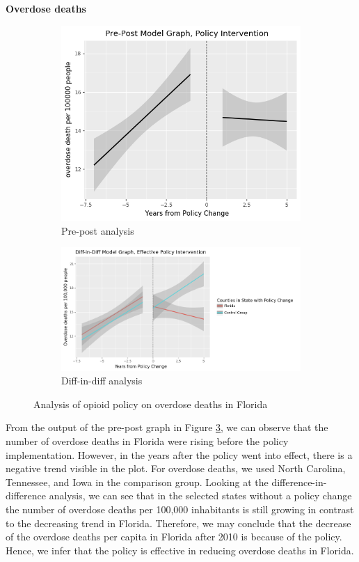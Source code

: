 \documentclass[12pt,letterpaper]{article}
\begin{document}
\noindent \textbf{Overdose deaths} \\

\begin{figure}[!h]
\centering
\begin{subfigure}{.5\textwidth}
  \centering
  \includegraphics[width=0.7\linewidth]{../30_results/General_Results/florida_overdose_death_prepost.png}
  \caption{Pre-post analysis}
  \label{fig:fl_death_prepost}
\end{subfigure}%
\begin{subfigure}{.55\textwidth}
  \centering
  \includegraphics[width=1\linewidth]{../30_results/General_Results/florida_overdose_death_diffdiff.png}
  \caption{Diff-in-diff analysis}
  \label{fig:fl_death_did}
\end{subfigure}
\caption{Analysis of opioid policy on overdose deaths in Florida}
\label{fig:fl_death}
\end{figure}


From the output of the pre-post graph in Figure \ref{fig:fl_death}, we can observe that the number of overdose deaths in Florida were rising before the policy implementation. However, in the years after the policy went into effect, there is a negative trend visible in the plot. For overdose deaths, we used North Carolina, Tennessee, and Iowa in the comparison group. Looking at the difference-in-difference analysis, we can see that in the selected states without a policy change the number of overdose deaths per 100,000 inhabitants is still growing in contrast to the decreasing trend in Florida.  Therefore, we may conclude that the decrease of the overdose deaths per capita in Florida after 2010 is because of the policy. Hence, we infer that the policy is effective in reducing overdose deaths in Florida.
\end{document}
